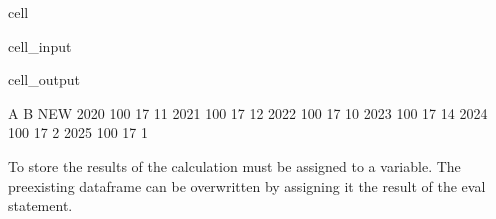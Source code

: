 \documentclass[letterpaper,10pt,english]{jupyterBook}
\begin{document}
\begin{sphinxuseclass}{cell}\begin{sphinxVerbatimInput}

\begin{sphinxuseclass}{cell_input}
\begin{sphinxVerbatim}[commandchars=\\\{\}]
\end{sphinxVerbatim}

\end{sphinxuseclass}\end{sphinxVerbatimInput}
\begin{sphinxVerbatimOutput}

\begin{sphinxuseclass}{cell_output}
\begin{sphinxVerbatim}[commandchars=\\\{\}]
        A   B  NEW
2020  100  17   11
2021  100  17   12
2022  100  17   10
2023  100  17   14
2024  100  17    2
2025  100  17    1
\end{sphinxVerbatim}

\end{sphinxuseclass}\end{sphinxVerbatimOutput}

\end{sphinxuseclass}
\sphinxAtStartPar
To store the results of the calculation must be assigned to a variable.  The pre\sphinxhyphen{}existing dataframe can be overwritten by assigning it the result of the eval statement.
\end{document}
